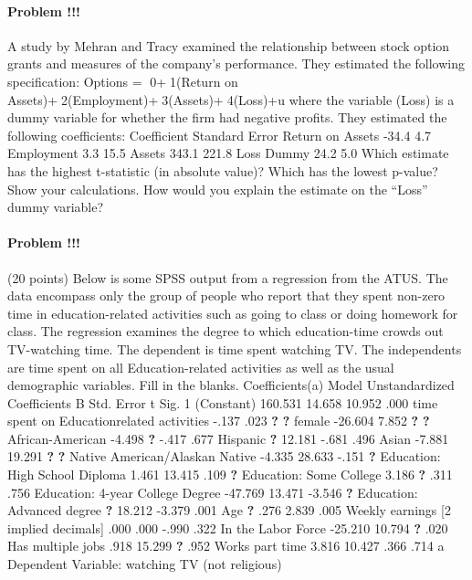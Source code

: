 \documentclass[]{article}
\let\oldparagraph\paragraph
\renewcommand{\paragraph}[1]{\oldparagraph{#1}\mbox{}}
\begin{document}
\paragraph{Problem !!!}\label{problem-14}

A study by Mehran and Tracy examined the relationship between stock
option grants and measures of the company's performance. They estimated
the following specification: Options = 0+1(Return on
Assets)+2(Employment)+3(Assets)+4(Loss)+u where the variable (Loss)
is a dummy variable for whether the firm had negative profits. They
estimated the following coefficients: Coefficient Standard Error Return
on Assets -34.4 4.7 Employment 3.3 15.5 Assets 343.1 221.8 Loss Dummy
24.2 5.0 Which estimate has the highest t-statistic (in absolute value)?
Which has the lowest p-value? Show your calculations. How would you
explain the estimate on the ``Loss'' dummy variable?

\paragraph{Problem !!!}\label{problem-15}

(20 points) Below is some SPSS output from a regression from the ATUS.
The data encompass only the group of people who report that they spent
non-zero time in education-related activities such as going to class or
doing homework for class. The regression examines the degree to which
education-time crowds out TV-watching time. The dependent is time spent
watching TV. The independents are time spent on all Education-related
activities as well as the usual demographic variables. Fill in the
blanks. Coefficients(a) Model Unstandardized Coefficients B Std. Error t
Sig. 1 (Constant) 160.531 14.658 10.952 .000 time spent on
Educationrelated activities -.137 .023 \textbf{?} \textbf{?} female
-26.604 7.852 \textbf{?} \textbf{?} African-American -4.498 \textbf{?}
-.417 .677 Hispanic \textbf{?} 12.181 -.681 .496 Asian -7.881 19.291
\textbf{?} \textbf{?} Native American/Alaskan Native -4.335 28.633 -.151
\textbf{?} Education: High School Diploma 1.461 13.415 .109 \textbf{?}
Education: Some College 3.186 \textbf{?} .311 .756 Education: 4-year
College Degree -47.769 13.471 -3.546 \textbf{?} Education: Advanced
degree \textbf{?} 18.212 -3.379 .001 Age \textbf{?} .276 2.839 .005
Weekly earnings {[}2 implied decimals{]} .000 .000 -.990 .322 In the
Labor Force -25.210 10.794 \textbf{?} .020 Has multiple jobs .918 15.299
\textbf{?} .952 Works part time 3.816 10.427 .366 .714 a Dependent
Variable: watching TV (not religious)
\end{document}
